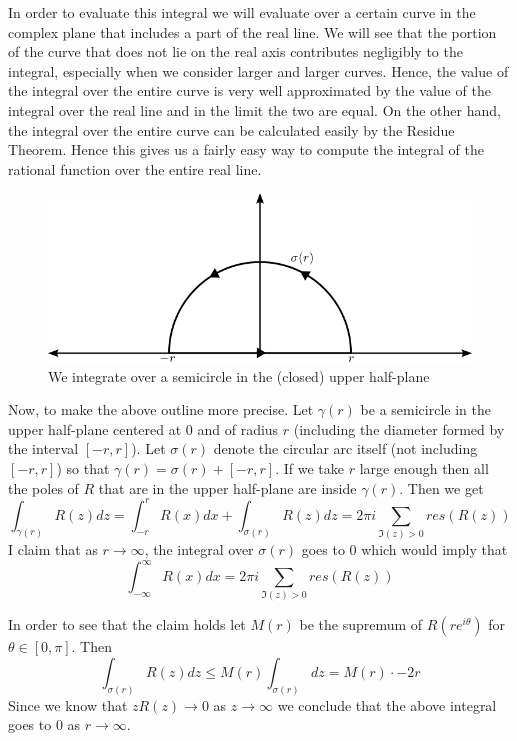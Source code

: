 In order to evaluate this integral we will evaluate over a certain curve in the complex plane that includes a part of the real line. We will see that the portion of the curve that does not lie on the real axis contributes negligibly to the integral, especially when we consider larger and larger curves. Hence, the value of the integral over the entire curve is very well approximated by the value of the integral over the real line and in the limit the two are equal. On the other hand, the integral over the entire curve can be calculated easily by the Residue Theorem. Hence this gives us a fairly easy way to compute the integral of the rational function over the entire real line.

\begin{figure}[h]
    \centering
    \includegraphics{Images/real_line_contour.png}
    \caption{We integrate over a semicircle in the (closed) upper half-plane}
    \label{fig:real-line-contour}
\end{figure}

Now, to make the above outline more precise. Let $\gamma(r)$ be a semicircle in the upper half-plane centered at 0 and of radius $r$ (including the diameter formed by the interval $[-r, r]$). Let $\sigma(r)$ denote the circular arc itself (not including $[-r, r]$) so that $\gamma(r) = \sigma(r) + [-r, r]$. 
If we take $r$ large enough then all the poles of $R$ that are in the upper half-plane are inside $\gamma(r)$. Then we get 
$$\int_{\gamma(r)} R(z) dz = \int_{-r}^r R(x) dx + \int_{\sigma(r)} R(z) dz = 2\pi i \sum_{\Im(z) > 0} res(R(z))$$
I claim that as $r \to \infty$, the integral over $\sigma(r)$ goes to 0 which would imply that
$$\int_{-\infty}^\infty R(x) dx = 2\pi i \sum_{\Im(z) > 0} res(R(z))$$

In order to see that the claim holds let $M(r)$ be the supremum of $R(re^{i \theta})$ for $\theta \in [0, \pi]$. Then
$$ \int_{\sigma(r)} R(z) dz \leq M(r) \int_{\sigma(r)} dz = M(r) \cdot -2r $$
Since we know that $zR(z) \to 0$ as $z \to \infty$ we conclude that the above integral goes to 0 as $r \to \infty$. 

